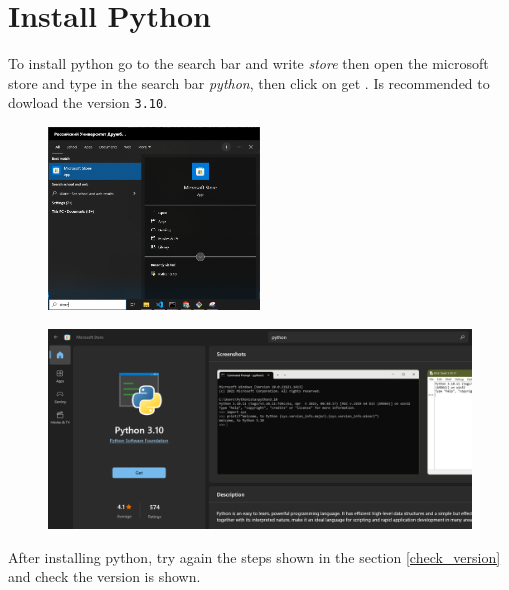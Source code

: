 \documentclass[12pt]{article}
\begin{document}
\section{Install Python}

To install python go to the search bar and write \emph{store} then open the microsoft store and type in the search bar \emph{python},
then click on get . Is recommended to dowload the version \texttt{3.10}.

\begin{figure}[H]
	\centering
	\includegraphics[width=0.5\textwidth ,keepaspectratio]{imgs/open_store.png}
	\caption{}
\end{figure}


\begin{figure}[H]
	\centering
	\includegraphics[width =1\textwidth ,keepaspectratio]{imgs/install_from_store.png}
	\caption{}
\end{figure}

After installing python, try again the steps shown in the section \ref{check_version} and check the version is shown.
\end{document}
